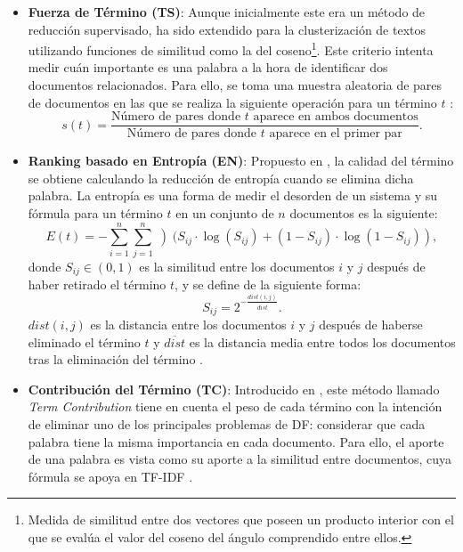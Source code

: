 \documentclass[10pt, a4paper]{article}
\begin{document}
\begin{itemize}
  \item \textbf{Fuerza de Término (TS)}: Aunque inicialmente este era un método de reducción supervisado, ha sido extendido para la clusterización de textos utilizando funciones de similitud como la del coseno\footnote{Medida de similitud entre dos vectores que poseen un producto interior con el que se evalúa el valor del coseno del ángulo comprendido entre ellos.}. Este criterio intenta medir cuán importante es una palabra a la hora de identificar dos documentos relacionados. Para ello, se toma una muestra aleatoria de pares de documentos en las que se realiza la siguiente operación para un término $t$ \cite{survey text, An Evaluation on Feature Selection for Text Clustering}: \begin{equation} s(t) = \frac{\text{Número de pares donde } t \text{ aparece en ambos documentos}}{\text{Número de pares donde } t \text{ aparece en el primer par}}.\end{equation} 
  
  \item \textbf{Ranking basado en Entropía (EN)}: Propuesto en \cite{entropia}, la calidad del término se obtiene calculando la reducción de entropía cuando se elimina dicha palabra. La entropía es una forma de medir el desorden de un sistema y su fórmula para un término $t$ en un conjunto de $n$ documentos es la siguiente: \begin{equation} E(t) = - \sum_{i=1}^{n} \sum_{j=1}^{n} \left)( S_{ij} \cdotp \log \left(S_{ij} \right) + \left( 1 - S_{ij}\right) \cdotp \log \left( 1 - S_{ij}\right) \right), \end{equation} donde $S_{ij} \in (0,1)$ es la similitud entre los documentos $i$ y $j$ después de haber retirado el término $t$, y se define de la siguiente forma:  \begin{equation} S_{ij} = 2^{- \frac{dist\left(i,j\right)}{\overline{dist}}}. \end{equation} $dist(i,j)$ es la distancia entre los documentos $i$ y $j$ después de haberse eliminado el término $t$ y $\overline{dist}$ es la distancia media entre todos los documentos tras la eliminación del término \cite{survey text, An Evaluation on Feature Selection for Text Clustering}.
  
  \item \textbf{Contribución del Término (TC)}: Introducido en \cite{An Evaluation on Feature Selection for Text Clustering}, este método llamado \textit{Term Contribution} tiene en cuenta el peso de cada término con la intención de eliminar uno de los principales problemas de DF: considerar que cada palabra tiene la misma importancia en cada documento. Para ello, el aporte de una palabra es vista como su aporte a la similitud entre documentos, cuya fórmula se apoya en TF-IDF \cite{survey text, An Evaluation on Feature Selection for Text Clustering}.
\end{itemize}
\end{document}
